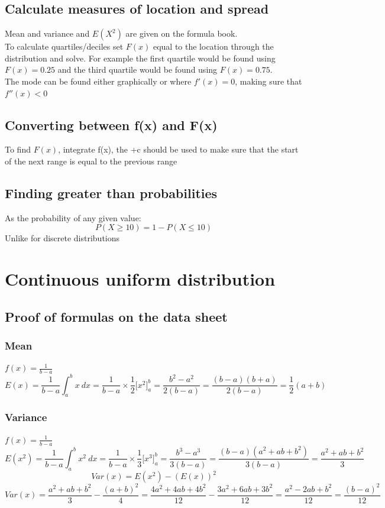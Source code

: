 \documentclass{article}[18pt]
\begin{document}
\subsection{Calculate measures of location and spread}
Mean and variance and $E(X^2)$ are given on the formula book.\\
To calculate quartiles/deciles set $F(x)$ equal to the location through the distribution and solve. For example the first quartile would be found using $F(x)=0.25$ and the third quartile would be found using $F(x)=0.75$.\\
The mode can be found either graphically or where $f'(x)=0$, making sure that $f''(x)<0$
\subsection{Converting between f(x) and F(x)}
To find $F(x)$, integrate f(x), the +c should be used to make sure that the start of the next range is equal to the previous range
\subsection{Finding greater than probabilities}
As the probability of any given value:
$$P(X\geqslant10)=1-P(X\leqslant10)$$
Unlike for discrete distributions
\newpage
\section{Continuous uniform distribution}
\subsection{Proof of formulas on the data sheet}
\subsubsection{Mean}
$f(x)=\frac{1}{b-a}$
$$E(x)=\frac{1}{b-a}\int_a^bx \ dx=\frac{1}{b-a}\times\frac{1}{2}\Big[x^2\Big]^b_a=\frac{b^2-a^2}{2(b-a)}=\frac{(b-a)(b+a)}{2(b-a)}=\frac{1}{2}(a+b)$$
\subsubsection{Variance}
$f(x)=\frac{1}{b-a}$
$$E(x^2)=\frac{1}{b-a}\int_a^bx^2 \ dx=\frac{1}{b-a}\times\frac{1}{3}\Big[x^3\Big]^b_a=\frac{b^3-a^3}{3(b-a)}=\frac{(b-a)(a^2+ab+b^2)}{3(b-a)}=\frac{a^2+ab+b^2}{3}$$
$$Var(x)=E(x^2)-(E(x))^2$$
$$Var(x)=\frac{a^2+ab+b^2}{3}-\frac{(a+b)^2}{4}=\frac{4a^2+4ab+4b^2}{12}-\frac{3a^2+6ab+3b^2}{12}=\frac{a^2-2ab+b^2}{12}=\frac{(b-a)^2}{12}$$
\end{document}
